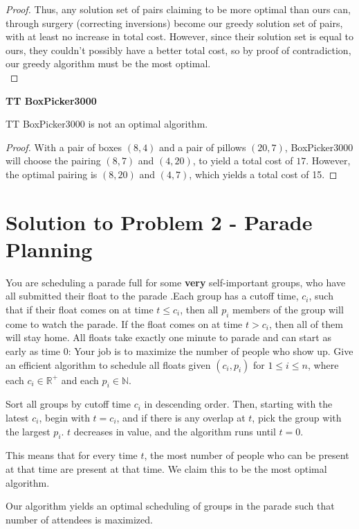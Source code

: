 \documentclass[11pt]{article}
\begin{document}
\begin{proof}
Thus, any solution set of pairs claiming to be more optimal than ours can, through surgery (correcting inversions) become our greedy solution set of pairs, with at least no increase in total cost. However, since their solution set is equal to ours, they couldn't possibly have a better total cost, so by proof of contradiction, our greedy algorithm must be the most optimal.\\
\end{proof}
\textbf{TT BoxPicker3000}
\begin{claim*}TT BoxPicker3000 is not an optimal algorithm.\end{claim*}
\begin{proof}
With a pair of boxes $(8,4)$ and a pair of pillows $(20,7)$, BoxPicker3000 will choose the pairing $(8,7)$ and $(4,20)$, to yield a total cost of $17$. However, the optimal pairing is $(8,20)$ and $(4,7)$, which yields a total cost of 15.
\end{proof}
\newpage

\section*{Solution to Problem 2 - Parade Planning}
You are scheduling a parade full for some \textbf{very} self-important groups, who have all submitted their float to the parade .Each group has a cutoff time, $c_i$, such that if their float comes on at time $t \leq c_i$, then all $p_i$ members of the group will come to watch the parade. If the float comes on at time $t > c_i$, then all of them will stay home. All floats take exactly one minute to parade and can start as early as time 0: Your job is to maximize the number of people who show up. Give an efficient algorithm to schedule all floats given $(c_i, p_i)$ for $1 \leq i \leq n$, where each $c_i \in \mathbb{R}^{+}$ and each $p_i \in \mathbb{N}$.

\begin{algo*}Sort all groups by cutoff time $c_i$ in descending order. Then, starting with the latest $c_i$, begin with $t = c_i$, and if there is any overlap at $t$, pick the group with the largest $p_i$. $t$ decreases in value, and the algorithm runs until $t = 0$.\end{algo*}

This means that for every time $t$, the most number of people who can be present at that time are present at that time. We claim this to be the most optimal algorithm.

\begin{claim*}Our algorithm yields an optimal scheduling of groups in the parade such that number of attendees is maximized.\end{claim*}
\end{document}

